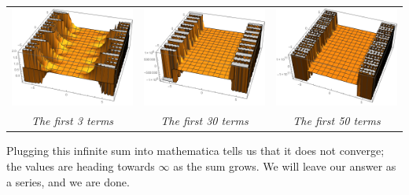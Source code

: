 \begin{center}
\begin{tabular}{c c c}
\includegraphics[scale=0.3]{lap_01_3} & \includegraphics[scale=0.3]{lap_01_30} & \includegraphics[scale=0.3]{lap_01_50}\\
\textit{The first 3 terms} & \textit{The first 30 terms} & \textit{The first 50 terms}
\end{tabular}
\end{center}
Plugging this infinite sum into mathematica tells us that it does not converge; the values are heading towards $\infty$ as the sum grows. We will leave our answer as a series, and we are done.
